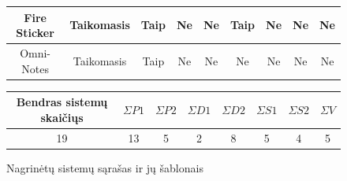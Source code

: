 \begin{figure}[H]
\begin{center}
\begin{tabular}{|c|c|c|c|c|c|c|c|c|}
        Fire Sticker                    & Taikomasis                & Taip                          & Ne                            & Ne                         & Taip                       & Ne                 & Ne                 & Ne                  \\ \hline
        Omni-Notes                      & Taikomasis                & Taip                          & Ne                            & Ne                         & Ne                         & Ne                 & Ne                 & Ne                  \\ \hline
    \end{tabular}

    \begin{tabular}{|c|c|c|c|c|c|c|c|}
        \hline
        Bendras sistemų skaičiųs & $\Sigma P1 $ & $\Sigma P2 $ & $\Sigma D1 $ & $\Sigma D2 $ & $\Sigma  S1 $ & $\Sigma  S2 $ & $\Sigma V $ \\ \hline\hline
        19 & 13 & 5 & 2 & 8 & 5 & 4 & 5 \\ \hline
    \end{tabular}
    \end{center}
    \caption{Nagrinėtų sistemų sąrašas ir jų šablonais}
    \label{table:analizedSystems}
\end{figure}
